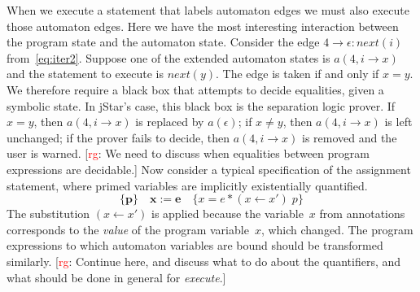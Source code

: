 \documentclass[a4paper]{article}
\newcommand{\rg}[1]{\todo{rg}{#1}}
\newcommand{\todo}[2]{{\small [\textcolor{red}{#1}: #2]}}
\theoremstyle{slanted}
\theoremstyle{definition}
\theoremstyle{remark}
\begin{document}
When we execute a statement that labels automaton edges we must also execute those automaton edges.
Here we have the most interesting interaction between the program state and the automaton state.
Consider the edge $4\to\epsilon:\mathit{next}(i)$ from~\eqref{eq:iter2}.
Suppose one of the extended automaton states is $a(4,i\to x)$ and the statement to execute is $\mathit{next}(y)$.
The edge is taken if and only if $x=y$.
We therefore require a black box that attempts to decide equalities, given a symbolic state.
In jStar's case, this black box is the separation logic prover.
If $x=y$, then $a(4,i\to x)$ is replaced by $a(\epsilon)$;
if $x\ne y$, then $a(4,i\to x)$ is left unchanged;
if the prover fails to decide, then $a(4,i\to x)$ is removed and the user is warned.
\rg{We need to discuss when equalities between program expressions are decidable.}
Now consider a typical specification of the assignment statement, where primed variables are implicitly existentially quantified.
  \[ \{\mathbf p\}\quad
  \mathbf x:=\mathbf e
  \quad\{x=e * (x\gets x')\;p\}\]
The substitution $(x\gets x')$ is applied because the variable~$x$ from annotations corresponds to the \emph{value} of the program variable~$x$, which changed.
The program expressions to which automaton variables are bound should be transformed similarly.
\rg{Continue here, and discuss what to do about the quantifiers, and what should be done in general for \textit{execute}.}





\end{document}
